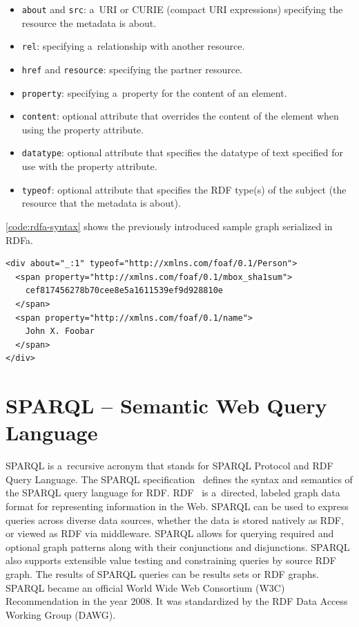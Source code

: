 \begin{itemize}
\item \texttt{about} and \texttt{src}: a~URI or CURIE (compact URI expressions) specifying the resource the metadata is about.
\item \texttt{rel}: specifying a~relationship with another resource.
\item \texttt{href} and \texttt{resource}: specifying the partner resource.
\item \texttt{property}: specifying a~property for the content of an element.
\item \texttt{content}: optional attribute that overrides the content of the element when using the property attribute.
\item \texttt{datatype}: optional attribute that specifies the datatype of text specified for use with the property attribute.
\item \texttt{typeof}: optional attribute that specifies the RDF type(s) of the subject (the resource that the metadata is about).
\end{itemize}

\autoref{code:rdfa-syntax} shows the previously introduced sample graph serialized in RDFa.

\begin{lstlisting}[caption={A sample graph in RDFa syntax.},label={code:rdfa-syntax}]
<div about="_:1" typeof="http://xmlns.com/foaf/0.1/Person">           
  <span property="http://xmlns.com/foaf/0.1/mbox_sha1sum">
    cef817456278b70cee8e5a1611539ef9d928810e
  </span> 
  <span property="http://xmlns.com/foaf/0.1/name">
    John X. Foobar
  </span>
</div> 
\end{lstlisting}

\section{SPARQL -- Semantic Web Query Language}
SPARQL is a~recursive acronym that stands for SPARQL Protocol and RDF Query Language.
The SPARQL specification~\cite{Prudhommeaux2008} defines the syntax and semantics
of the SPARQL query language for RDF.
RDF~\cite{Klyne2004} is a~directed, labeled graph data format for representing information in the Web.
SPARQL can be used to express queries across diverse data sources,
whether the data is stored natively as RDF, or viewed as RDF via middleware.
SPARQL allows for querying required and optional graph patterns
along with their conjunctions and disjunctions.
SPARQL also supports extensible value testing and constraining queries by source RDF graph.
The results of SPARQL queries can be results sets or RDF graphs.
SPARQL became an official World Wide Web Consortium (W3C) Recommendation in the year 2008.
It was standardized by the RDF Data Access Working Group (DAWG).

